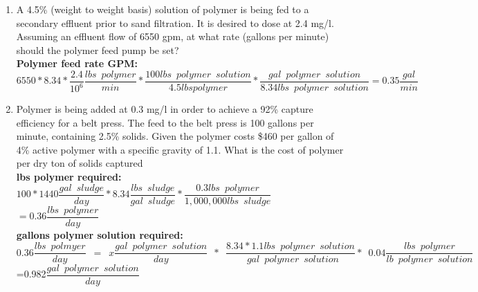 \documentclass{article}
\begin{document}
\begin{enumerate}
\item A 4.5\% (weight to weight basis) solution of polymer is being fed to a secondary effluent prior to sand filtration. It is desired to dose at 2.4 mg/l. Assuming an effluent flow of 6550 gpm, at what rate (gallons per minute) should the polymer feed pump be set?\\
\vspace{0.25cm}
\textbf{Polymer feed rate GPM:}\\
\vspace{0.25cm}
$6550*8.34*\dfrac{2.4}{10^6}\dfrac{lbs \enspace polymer}{min}*
\dfrac{100lbs \enspace polymer \enspace solution}{4.5 lbs polymer}*
\dfrac{gal \enspace polymer \enspace solution}{8.34 lbs \enspace polymer \enspace solution}=\boxed{0.35\dfrac{gal}{min}}$
\pagebreak
\item Polymer is being added at 0.3 mg/l in order to achieve a 92\% capture efficiency for a belt press. The feed to the belt press is 100 gallons per minute, containing 2.5\% solids. Given the polymer costs \$460 per gallon of 4\% active polymer with a specific gravity of 1.1. What is the cost of polymer per dry ton of solids captured \\


\textbf{lbs polymer required:}\\
\vspace{0.25cm}
$100*1440 \dfrac{gal \enspace sludge}{day}* 8.34 \dfrac{lbs \enspace sludge}{gal \enspace sludge} *\dfrac{0.3lbs \enspace polymer}{1,000,000 lbs \enspace sludge}$\\
\vspace{0.25cm}
$= 0.36 \dfrac{lbs \enspace polymer}{day}$\\

\vspace{0.25cm}
\textbf{gallons polymer solution required:}\\
\vspace{0.25cm}
$0.36 \dfrac{lbs \enspace polmyer}{day}\enspace=\enspace x \dfrac{gal \enspace polymer \enspace solution}{day} \enspace * \enspace \dfrac{8.34*1.1lbs \enspace polymer \enspace solution}{\enspace gal \enspace polymer \enspace solution}* \enspace 0.04 \dfrac{lbs \enspace polymer}{lb \enspace polymer \enspace solution}$\\
\vspace{0.25cm}
=0.982$\dfrac{gal \enspace polymer \enspace solution}{day}$
\vspace{0.25cm}


\end{enumerate}
\end{document}
